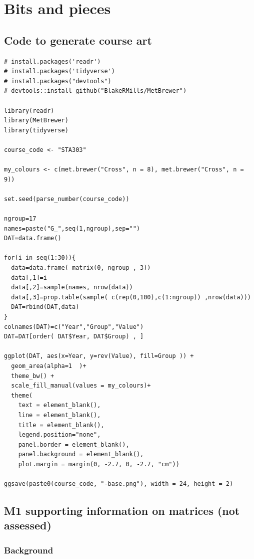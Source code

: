 \documentclass[
  openany]{book}
\begin{document}
\hypertarget{bits-and-pieces}{%
\chapter{Bits and pieces}\label{bits-and-pieces}}

\hypertarget{code-to-generate-course-art}{%
\section{Code to generate course art}\label{code-to-generate-course-art}}

\begin{verbatim}
# install.packages('readr')
# install.packages('tidyverse')
# install.packages("devtools")
# devtools::install_github("BlakeRMills/MetBrewer")

library(readr)
library(MetBrewer)
library(tidyverse)

course_code <- "STA303"

my_colours <- c(met.brewer("Cross", n = 8), met.brewer("Cross", n = 9))

set.seed(parse_number(course_code))

ngroup=17
names=paste("G_",seq(1,ngroup),sep="")
DAT=data.frame()

for(i in seq(1:30)){
  data=data.frame( matrix(0, ngroup , 3))
  data[,1]=i
  data[,2]=sample(names, nrow(data))
  data[,3]=prop.table(sample( c(rep(0,100),c(1:ngroup)) ,nrow(data)))
  DAT=rbind(DAT,data)
}
colnames(DAT)=c("Year","Group","Value")
DAT=DAT[order( DAT$Year, DAT$Group) , ]

ggplot(DAT, aes(x=Year, y=rev(Value), fill=Group )) +
  geom_area(alpha=1  )+
  theme_bw() +
  scale_fill_manual(values = my_colours)+
  theme(
    text = element_blank(),
    line = element_blank(),
    title = element_blank(),
    legend.position="none",
    panel.border = element_blank(),
    panel.background = element_blank(),
    plot.margin = margin(0, -2.7, 0, -2.7, "cm"))

ggsave(paste0(course_code, "-base.png"), width = 24, height = 2)
\end{verbatim}

\hypertarget{matrices}{%
\section{M1 supporting information on matrices (not assessed)}\label{matrices}}

\hypertarget{background}{%
\subsection{Background}\label{background}}
\end{document}
